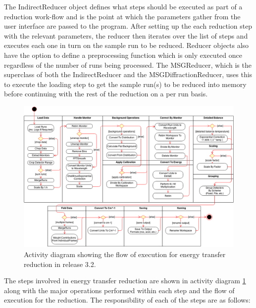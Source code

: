 \documentclass[paper=a4, fontsize=11pt]{scrartcl}	%
\numberwithin{equation}{section}															%
\numberwithin{figure}{section}																%
\numberwithin{table}{section}																%
\begin{document}
The IndirectReducer object defines what steps should be executed as part of a reduction work-flow and is the point at which the parameters gather from the user interface are passed to the program. After setting up the each reduction step with the relevant parameters, the reducer then iterates over the list of steps and executes each one in turn on the sample run to be reduced. Reducer objects also have the option to define a preprocessing function which is only executed once regardless of the number of runs being processed. The MSGReducer, which is the superclass of both the IndirectReducer and the MSGDiffractionReducer, uses this to execute the loading step to get the sample run(s) to be reduced into memory before continuing with the rest of the reduction on a per run basis.

\begin{figure}[H]
\centering
\includegraphics[width=1\textwidth]{img/uml/activity_diagrams/EnergyTransfer_activity.png}
\caption{Activity diagram showing the flow of execution for energy transfer reduction in release 3.2.}
\label{fig:c2e-energy-transfer-activity-diagram}
\end{figure}

The steps involved in energy transfer reduction are shown in activity diagram \ref{fig:c2e-energy-transfer-activity-diagram} along with the major operations performed within each step and the flow of execution for the reduction. The responsibility of each of the steps are as follows:
\end{document}
